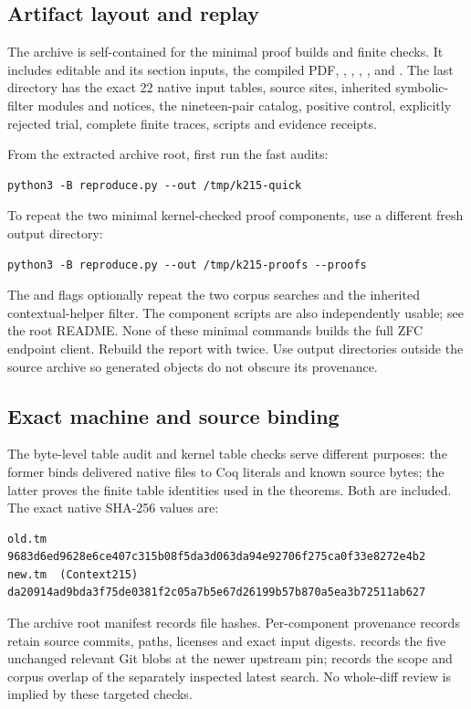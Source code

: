 \subsection{Artifact layout and replay}

The archive is self-contained for the minimal proof builds and finite checks. It includes editable  and its section inputs, the compiled PDF, , , , , and . The last directory has the exact 22 native input tables, source sites, inherited symbolic-filter modules and notices, the nineteen-pair catalog, positive control, explicitly rejected trial, complete finite traces, scripts and evidence receipts.

From the extracted archive root, first run the fast audits:
\begin{lstlisting}
python3 -B reproduce.py --out /tmp/k215-quick
\end{lstlisting}
To repeat the two minimal kernel-checked proof components, use a different fresh output directory:
\begin{lstlisting}
python3 -B reproduce.py --out /tmp/k215-proofs --proofs
\end{lstlisting}
The  and  flags optionally repeat the two corpus searches and the inherited contextual-helper filter. The component scripts are also independently usable; see the root README. None of these minimal commands builds the full ZFC endpoint client. Rebuild the report with  twice. Use output directories outside the source archive so generated objects do not obscure its provenance.

\subsection{Exact machine and source binding}

The byte-level table audit and kernel table checks serve different purposes: the former binds delivered native files to Coq literals and known source bytes; the latter proves the finite table identities used in the theorems. Both are included. The exact native SHA-256 values are:
\begin{lstlisting}
old.tm
9683d6ed9628e6ce407c315b08f5da3d063da94e92706f275ca0f33e8272e4b2
new.tm  (Context215)
da20914ad9bda3f75de0381f2c05a7b5e67d26199b57b870a5ea3b72511ab627
\end{lstlisting}
The archive root manifest records file hashes. Per-component provenance records retain source commits, paths, licenses and exact input digests.  records the five unchanged relevant Git blobs at the newer upstream pin;  records the scope and corpus overlap of the separately inspected latest search. No whole-diff review is implied by these targeted checks.
